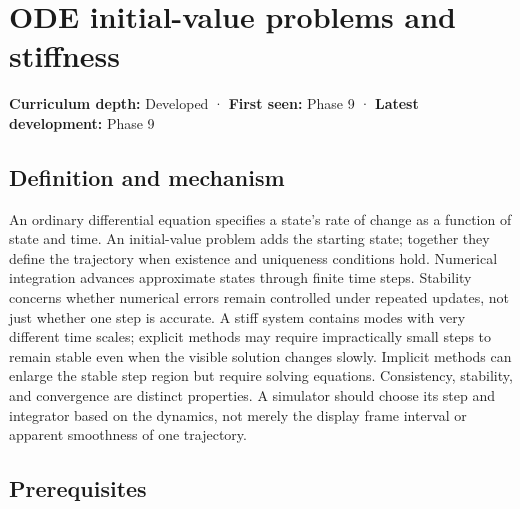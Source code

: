 \hypertarget{appendix-e8ab9836882e}{}\label{referencestart:appendix-e8ab9836882e}
\section{ODE initial-value problems and stiffness}\label{appendix-e8ab9836882e-ode-initial-value-problems-and-stiffness}

\hypertarget{appendix-e8ab9836882e-ode-initial-value-problems-and-stiffness}{}

\textbf{Curriculum depth:} Developed · \textbf{First seen:} Phase 9 · \textbf{Latest development:} Phase 9

\begin{allmightroledefinition}

\subsection{Definition and mechanism}\label{appendix-e8ab9836882e-definition-and-mechanism}

\hypertarget{appendix-e8ab9836882e-definition-and-mechanism}{}

An ordinary differential equation specifies a state's rate of change as a function of state and time. An initial-value problem adds the starting state; together they define the trajectory when existence and uniqueness conditions hold. Numerical integration advances approximate states through finite time steps. Stability concerns whether numerical errors remain controlled under repeated updates, not just whether one step is accurate. A stiff system contains modes with very different time scales; explicit methods may require impractically small steps to remain stable even when the visible solution changes slowly. Implicit methods can enlarge the stable step region but require solving equations. Consistency, stability, and convergence are distinct properties. A simulator should choose its step and integrator based on the dynamics, not merely the display frame interval or apparent smoothness of one trajectory.

\end{allmightroledefinition}

\subsection{Prerequisites}\label{appendix-e8ab9836882e-prerequisites}

\hypertarget{appendix-e8ab9836882e-prerequisites}{}

